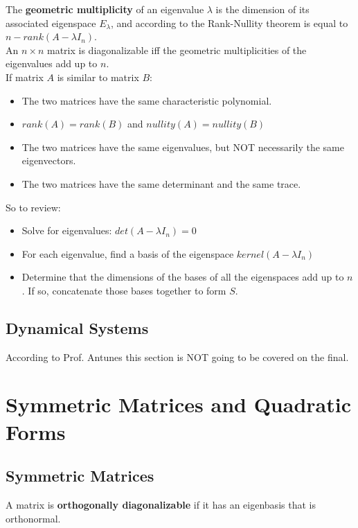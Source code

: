 \documentclass[]{scrartcl}
\begin{document}
	The \textbf{geometric multiplicity} of an eigenvalue $\lambda$ is the dimension of its associated eigenspace $E_\lambda$, and according to the Rank-Nullity theorem is equal to $n - rank(A - \lambda I_n)$.\\
	
	An $n \times n$ matrix is diagonalizable iff the geometric multiplicities of the eigenvalues add up to $n$.\\
	
	If matrix $A$ is similar to matrix $B$:
	\begin{itemize}
		\item The two matrices have the same characteristic polynomial.
		\item $rank(A) = rank(B)$ and $nullity(A) = nullity(B)$
		\item The two matrices have the same eigenvalues, but NOT necessarily the same eigenvectors.
		\item The two matrices have the same determinant and the same trace.
	\end{itemize}
	
	So to review:
	\begin{itemize}
		\item Solve for eigenvalues: $ det(A - \lambda I_n) = 0 $
		\item For each eigenvalue, find a basis of the eigenspace $kernel(A - \lambda I_n)$
		\item Determine that the dimensions of the bases of all the eigenspaces add up to $n$. If so, concatenate those bases together to form $S$.
	\end{itemize} 
	
	\subsection{Dynamical Systems}
	According to Prof. Antunes this section is NOT going to be covered on the final.
	
	\setcounter{section}{7}
	\section{Symmetric Matrices and Quadratic Forms}
	\subsection{Symmetric Matrices}
	A matrix is \textbf{orthogonally diagonalizable} if it has an eigenbasis that is orthonormal.\\
	
\end{document}
